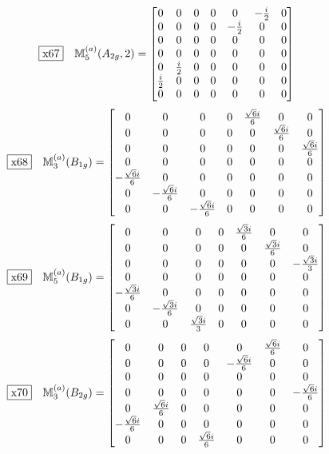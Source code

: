 \documentclass[fleqn,10pt,landscape]{jsarticle}
\begin{document}
\begin{dmath*}
\fbox{x67}\quad \mathbb{M}_{5}^{(a)}(A_{2g},2)=\begin{bmatrix} 0 & 0 & 0 & 0 & 0 & - \frac{i}{2} & 0 \\ 0 & 0 & 0 & 0 & - \frac{i}{2} & 0 & 0 \\ 0 & 0 & 0 & 0 & 0 & 0 & 0 \\ 0 & 0 & 0 & 0 & 0 & 0 & 0 \\ 0 & \frac{i}{2} & 0 & 0 & 0 & 0 & 0 \\ \frac{i}{2} & 0 & 0 & 0 & 0 & 0 & 0 \\ 0 & 0 & 0 & 0 & 0 & 0 & 0 \end{bmatrix}
\end{dmath*}
\begin{dmath*}
\fbox{x68}\quad \mathbb{M}_{3}^{(a)}(B_{1g})=\begin{bmatrix} 0 & 0 & 0 & 0 & \frac{\sqrt{6} i}{6} & 0 & 0 \\ 0 & 0 & 0 & 0 & 0 & \frac{\sqrt{6} i}{6} & 0 \\ 0 & 0 & 0 & 0 & 0 & 0 & \frac{\sqrt{6} i}{6} \\ 0 & 0 & 0 & 0 & 0 & 0 & 0 \\ - \frac{\sqrt{6} i}{6} & 0 & 0 & 0 & 0 & 0 & 0 \\ 0 & - \frac{\sqrt{6} i}{6} & 0 & 0 & 0 & 0 & 0 \\ 0 & 0 & - \frac{\sqrt{6} i}{6} & 0 & 0 & 0 & 0 \end{bmatrix}
\end{dmath*}
\begin{dmath*}
\fbox{x69}\quad \mathbb{M}_{5}^{(a)}(B_{1g})=\begin{bmatrix} 0 & 0 & 0 & 0 & \frac{\sqrt{3} i}{6} & 0 & 0 \\ 0 & 0 & 0 & 0 & 0 & \frac{\sqrt{3} i}{6} & 0 \\ 0 & 0 & 0 & 0 & 0 & 0 & - \frac{\sqrt{3} i}{3} \\ 0 & 0 & 0 & 0 & 0 & 0 & 0 \\ - \frac{\sqrt{3} i}{6} & 0 & 0 & 0 & 0 & 0 & 0 \\ 0 & - \frac{\sqrt{3} i}{6} & 0 & 0 & 0 & 0 & 0 \\ 0 & 0 & \frac{\sqrt{3} i}{3} & 0 & 0 & 0 & 0 \end{bmatrix}
\end{dmath*}
\begin{dmath*}
\fbox{x70}\quad \mathbb{M}_{3}^{(a)}(B_{2g})=\begin{bmatrix} 0 & 0 & 0 & 0 & 0 & \frac{\sqrt{6} i}{6} & 0 \\ 0 & 0 & 0 & 0 & - \frac{\sqrt{6} i}{6} & 0 & 0 \\ 0 & 0 & 0 & 0 & 0 & 0 & 0 \\ 0 & 0 & 0 & 0 & 0 & 0 & - \frac{\sqrt{6} i}{6} \\ 0 & \frac{\sqrt{6} i}{6} & 0 & 0 & 0 & 0 & 0 \\ - \frac{\sqrt{6} i}{6} & 0 & 0 & 0 & 0 & 0 & 0 \\ 0 & 0 & 0 & \frac{\sqrt{6} i}{6} & 0 & 0 & 0 \end{bmatrix}
\end{dmath*}
\end{document}
